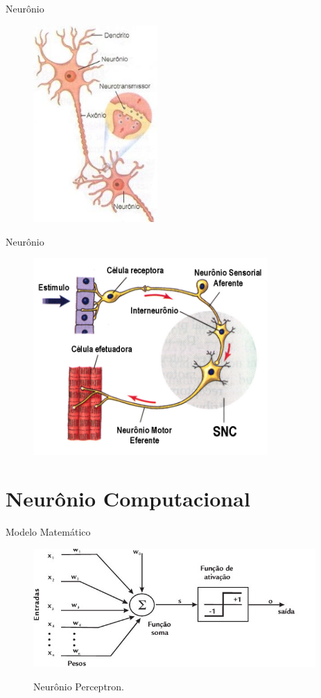 \documentclass[compress]{beamer}
\begin{document}
\begin{frame}{Neurônio}
    \begin{figure}[h]
        \includegraphics[height=7.5cm]{img/sinapse.jpg}
    \end{figure}
\end{frame}

\begin{frame}{Neurônio}
    \begin{figure}[h]
        \includegraphics[height=7.5cm]{img/comunicacao.jpg}
    \end{figure}
\end{frame}

\section{Neurônio Computacional}

\begin{frame}{Modelo Matemático}
    \begin{figure}[h]
        \includegraphics[height=4.5cm]{img/neuronio.png}
        
        Neurônio Perceptron\cite{Rosa2012Jun}.
    \end{figure}
\end{frame}
\end{document}
